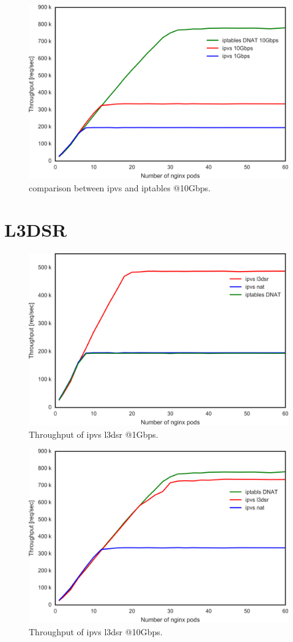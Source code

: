 \begin{figure}[t]
  \centering
  \includegraphics[width=0.8\columnwidth]{Figs/ipvs_iptables_dnat_10g}
  \caption{comparison between ipvs and iptables @10Gbps.}
  \label{fig:ipvs_iptables_dnat_10g}
\end{figure}

\section{L3DSR}

\begin{figure}[t]
  \centering
  \includegraphics[width=0.8\columnwidth]{Figs/ipvs_l3dsr_1g.png}
  \caption{Throughput of ipvs l3dsr @1Gbps.}
  \label{fig:ipvs_l3dsr_1g.png}
\end{figure}

\begin{figure}[t]
  \centering
  \includegraphics[width=0.8\columnwidth]{Figs/ipvs_l3dsr_10g.png}
  \caption{Throughput of ipvs l3dsr @10Gbps.}
  \label{fig:ipvs_l3dsr_10g.png}
\end{figure}

